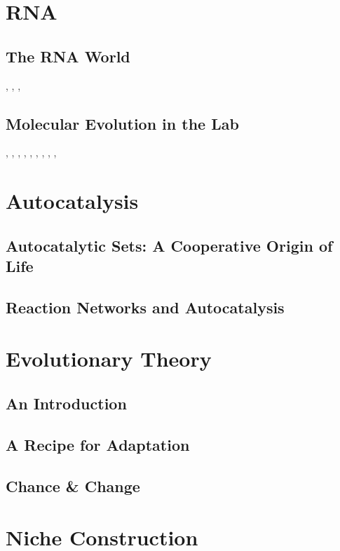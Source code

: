 \documentclass[]{article}
\begin{document}
\section{RNA}

\subsection{The RNA World}
\cite{robertson2012origins}, \cite{joyce2018protocells}, \cite{hud2018searching},  \cite{hoshika2019hachimoji}

\subsection{Molecular Evolution in the Lab}

\cite{joyce2007forty}, \cite{seelig2007selection}, \cite{chen2007ribozyme}, \cite{gold2012aptamers}, \cite{sefah2014vitro}, \cite{pinheiro2012synthetic}, \cite{mansy2007structure}, \cite{bartel1993isolation}, \cite{petrie2014limits}, \cite{pressman2019mapping}

\section{Autocatalysis}

\subsection{Autocatalytic Sets: A Cooperative Origin of Life}

\subsection{Reaction Networks and Autocatalysis}

\section{Evolutionary Theory}

\subsection{An Introduction}

\subsection{A Recipe for Adaptation}

\subsection{Chance \& Change}

\section{Niche Construction}


\printglossaries

 


\end{document}
